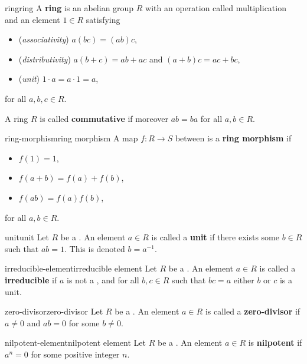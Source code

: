 \begin{topic}{ring}{ring}
    A \textbf{ring} is an abelian group $R$ with an operation called multiplication and an element $1 \in R$ satisfying
    \begin{itemize}
        \item (\textit{associativity}) $a(bc) = (ab)c$,
        \item (\textit{distributivity}) $a(b + c) = ab + ac$ and $(a + b)c = ac + bc$,
        \item (\textit{unit}) $1 \cdot a = a \cdot 1 = a$,
    \end{itemize}
    for all $a, b, c \in R$.
    
    A ring $R$ is called \textbf{commutative} if moreover $ab = ba$ for all $a, b \in R$.
\end{topic}

\begin{topic}{ring-morphism}{ring morphism}
    A map $f : R \to S$ between  is a \textbf{ring morphism} if
    \begin{itemize}
        \item $f(1) = 1$,
        \item $f(a + b) = f(a) + f(b)$,
        \item $f(ab) = f(a) f(b)$,
    \end{itemize}
    for all $a, b \in R$.
\end{topic}

\begin{topic}{unit}{unit}
    Let $R$ be a . An element $a \in R$ is called a \textbf{unit} if there exists some $b \in R$ such that $ab = 1$. This is denoted $b = a^{-1}$.
\end{topic}

\begin{topic}{irreducible-element}{irreducible element}
    Let $R$ be a . An element $a \in R$ is called a \textbf{irreducible} if $a$ is not a , and for all $b, c \in R$ such that $bc = a$ either $b$ or $c$ is a unit.
\end{topic}

\begin{topic}{zero-divisor}{zero-divisor}
    Let $R$ be a . An element $a \in R$ is called a \textbf{zero-divisor} if $a \ne 0$ and $ab = 0$ for some $b \ne 0$.
\end{topic}

\begin{topic}{nilpotent-element}{nilpotent element}
    Let $R$ be a . An element $a \in R$ is \textbf{nilpotent} if $a^n = 0$ for some positive integer $n$.
\end{topic}

